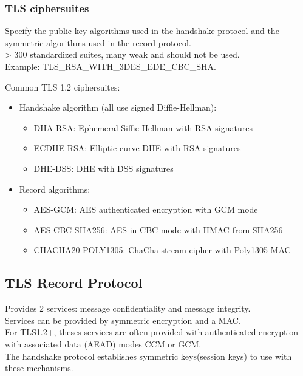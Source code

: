 \documentclass{article}
\begin{document}
\subsubsection{TLS ciphersuites}

Specify the public key algorithms used in the handshake protocol and the symmetric algorithms used in the record protocol.\\
> 300 standardized suites, many weak and should not be used.\\
Example: TLS\_RSA\_WITH\_3DES\_EDE\_CBC\_SHA.

Common TLS 1.2 ciphersuites:
\begin{itemize}
    \item Handshake algorithm (all use signed Diffie-Hellman):
    \begin{itemize}
        \item DHA-RSA: Ephemeral Siffie-Hellman with RSA signatures
        \item ECDHE-RSA: Elliptic curve DHE with RSA signatures
        \item DHE-DSS: DHE with DSS signatures
    \end{itemize}
    \item Record algorithms:
    \begin{itemize}
        \item AES-GCM: AES authenticated encryption with GCM mode
        \item AES-CBC-SHA256: AES in CBC mode with HMAC from SHA256
        \item CHACHA20-POLY1305: ChaCha stream cipher with Poly1305 MAC
    \end{itemize}
\end{itemize}

\subsection{TLS Record Protocol}

Provides 2 services: message confidentiality and message integrity.\\
Services can be provided by symmetric encryption and a MAC.\\
For TLS1.2+, theses services are often provided with authenticated encryption with associated data (AEAD) modes CCM or GCM.\\
The handshake protocol establishes symmetric keys(session keys) to use with these mechanisms.
\end{document}
